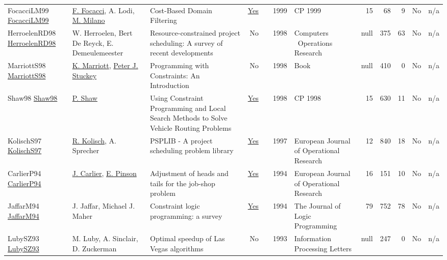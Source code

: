{\begin{longtable}{>{\raggedright\arraybackslash}p{3cm}>{\raggedright\arraybackslash}p{6cm}>{\raggedright\arraybackslash}p{6.5cm}rrrp{2.5cm}rrrrr}
FocacciLM99 \href{https://doi.org/10.1007/978-3-540-48085-3_14}{FocacciLM99} & \hyperref[auth:a784]{F. Focacci}, A. Lodi, \hyperref[auth:a144]{M. Milano} & Cost-Based Domain Filtering & \href{../works/FocacciLM99.pdf}{Yes} & \cite{FocacciLM99} & 1999 & CP 1999 & 15 & 68 & 9 & No & n/a\\
HerroelenRD98 \href{http://dx.doi.org/10.1016/s0305-0548(97)00055-5}{HerroelenRD98} & W. Herroelen, Bert De Reyck, E. Demeulemeester & Resource-constrained project scheduling: A survey of recent developments & No & \cite{HerroelenRD98} & 1998 & Computers \  Operations Research & null & 375 & 63 & No & n/a\\
MarriottS98 \href{http://dx.doi.org/10.7551/mitpress/5625.001.0001}{MarriottS98} & \hyperref[auth:a696]{K. Marriott}, \hyperref[auth:a126]{Peter J. Stuckey} & Programming with Constraints: An Introduction & No & \cite{MarriottS98} & 1998 & Book & null & 410 & 0 & No & n/a\\
Shaw98 \href{https://doi.org/10.1007/3-540-49481-2_30}{Shaw98} & \hyperref[auth:a120]{P. Shaw} & Using Constraint Programming and Local Search Methods to Solve Vehicle Routing Problems & \href{../works/Shaw98.pdf}{Yes} & \cite{Shaw98} & 1998 & CP 1998 & 15 & 630 & 11 & No & n/a\\
KolischS97 \href{http://dx.doi.org/10.1016/s0377-2217(96)00170-1}{KolischS97} & \hyperref[auth:a445]{R. Kolisch}, A. Sprecher & PSPLIB - A project scheduling problem library & \href{../works/KolischS97.pdf}{Yes} & \cite{KolischS97} & 1997 & European Journal of Operational Research & 12 & 840 & 18 & No & n/a\\
CarlierP94 \href{http://dx.doi.org/10.1016/0377-2217(94)90379-4}{CarlierP94} & \hyperref[auth:a854]{J. Carlier}, \hyperref[auth:a855]{E. Pinson} & Adjustment of heads and tails for the job-shop problem & \href{../works/CarlierP94.pdf}{Yes} & \cite{CarlierP94} & 1994 & European Journal of Operational Research & 16 & 151 & 10 & No & n/a\\
JaffarM94 \href{http://dx.doi.org/10.1016/0743-1066(94)90033-7}{JaffarM94} & J. Jaffar, Michael J. Maher & Constraint logic programming: a survey & \href{../works/JaffarM94.pdf}{Yes} & \cite{JaffarM94} & 1994 & The Journal of Logic Programming & 79 & 752 & 78 & No & n/a\\
LubySZ93 \href{http://dx.doi.org/10.1016/0020-0190(93)90029-9}{LubySZ93} & M. Luby, A. Sinclair, D. Zuckerman & Optimal speedup of Las Vegas algorithms & No & \cite{LubySZ93} & 1993 & Information Processing Letters & null & 247 & 0 & No & n/a\\

\end{longtable}}
